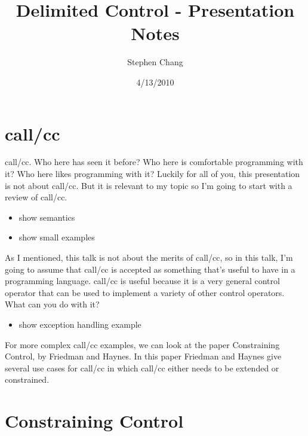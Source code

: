 \documentclass[letterpaper]{llncs}
\begin{document}

\title{Delimited Control - Presentation Notes}
\author{Stephen Chang}
\institute{}
\date{4/13/2010}
\maketitle

\section*{call/cc}

call/cc. Who here has seen it before? Who here is comfortable programming with it? Who here likes programming with it? Luckily for all of you, this presentation is not about call/cc. But it is relevant to my topic so I'm going to start with a review of call/cc.

\begin{itemize}
	\item show semantics
	\item show small examples
\end{itemize}

As I mentioned, this talk is not about the merits of call/cc, so in this talk, I'm going to assume that call/cc is accepted as something that's useful to have in a programming language. call/cc is useful because it is a very general control operator that can be used to implement a variety of other control operators. What can you do with it?

\begin{itemize}
	\item show exception handling example
\end{itemize}

For more complex call/cc examples, we can look at the paper Constraining Control, by Friedman and Haynes. In this paper Friedman and Haynes give several use cases for call/cc in which call/cc either needs to be extended or constrained.


\section*{Constraining Control}%
\end{document}
